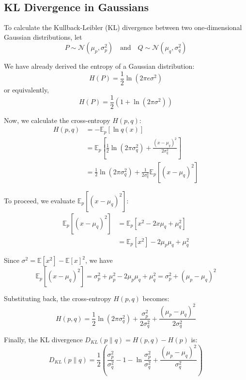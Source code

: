 
\subsection{KL Divergence in Gaussians}

To calculate the Kullback-Leibler (KL) divergence between two one-dimensional Gaussian distributions, let
\[
    P \sim \mathcal{N}(\mu_p, \sigma_p^2) \quad \text{and} \quad Q \sim \mathcal{N}(\mu_q, \sigma_q^2)
\]

We have already derived the entropy of a Gaussian distribution:
\begin{equation}
    H(P) = \frac{1}{2} \ln(2\pi e \sigma^2) \label{eq:gaussian_entropy}
\end{equation}
or equivalently,
\[
    H(P) = \frac{1}{2} (1 + \ln(2\pi \sigma^2))
\]

Now, we calculate the cross-entropy \(H(p, q)\):
\begin{align*}
    H(p, q) & = -\mathbb{E}_p [\ln q(x)]                                                                         \\
            & = \mathbb{E}_p \left[ \frac{1}{2} \ln(2\pi \sigma_q^2) + \frac{(x - \mu_q)^2}{2\sigma_q^2} \right] \\
            & = \frac{1}{2} \ln(2\pi \sigma_q^2) + \frac{1}{2\sigma_q^2} \mathbb{E}_p \left[(x - \mu_q)^2\right]
\end{align*}

To proceed, we evaluate \(\mathbb{E}_p \left[(x - \mu_q)^2\right]\):
\begin{align*}
    \mathbb{E}_p \left[(x - \mu_q)^2\right] & = \mathbb{E}_p \left[x^2 - 2x\mu_q + \mu_q^2\right] \\
                                            & = \mathbb{E}_p[x^2] - 2\mu_p\mu_q + \mu_q^2
\end{align*}

Since \(\sigma^2 = \mathbb{E}[x^2] - \mathbb{E}[x]^2\), we have
\[
    \mathbb{E}_p \left[(x - \mu_q)^2\right]= \sigma_p^2 + \mu_p^2 - 2\mu_p\mu_q + \mu_q^2 = \sigma_p^2 + (\mu_p - \mu_q)^2
\]

Substituting back, the cross-entropy \(H(p, q)\) becomes:
\[
    H(p, q) = \frac{1}{2} \ln(2\pi \sigma_q^2) + \frac{\sigma_p^2}{2\sigma_q^2} + \frac{(\mu_p - \mu_q)^2}{2\sigma_q^2}
\]

Finally, the KL divergence \(D_{KL}(p \parallel q) = H(p, q) - H(p)\) is:
\[
    D_{KL}(p \parallel q) = \frac{1}{2} \left( \frac{\sigma_p^2}{\sigma_q^2} - 1 - \ln \frac{\sigma_p^2}{\sigma_q^2} + \frac{(\mu_p - \mu_q)^2}{\sigma_q^2} \right)
\]

